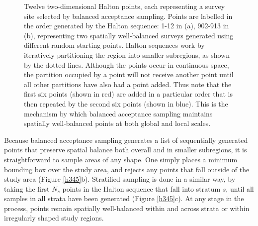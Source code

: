 \documentclass[a4paper,11pt]{article} %
\begin{document}
\begin{figure}[htbp]
\begin{subfigure}[b]{0.45\textwidth}
    \caption{}
  \end{subfigure}
\caption{Twelve two-dimensional Halton points, each representing a survey site selected by balanced acceptance sampling. Points are labelled in the order generated by the Halton sequence: 1-12 in (a), 902-913 in (b), representing two spatially well-balanced surveys generated using different random starting points. Halton sequences work by iteratively partitioning the region into smaller subregions, as shown by the dotted lines. Although the points occur in continuous space, the partition occupied by a point will not receive another point until all other partitions have also had a point added. Thus note that the first six points (shown in red) are added in a particular order that is then repeated by the second six points (shown in blue). This is the mechanism by which balanced acceptance sampling maintains spatially well-balanced points at both global and local scales.}
  \label{h12}
\end{figure}

Because balanced acceptance sampling generates a list of sequentially generated points that preserve spatial balance both overall and in smaller subregions, it is straightforward to sample areas of any shape. One simply places a minimum bounding box over the study area, and rejects any points that fall outside of the study area (Figure \ref{h345}b). Stratified sampling is done in a similar way, by taking the first $N_s$ points in the Halton sequence that fall into stratum $s$, until all samples in all strata have been generated (Figure \ref{h345}c). At any stage in the process, points remain spatially well-balanced within and across strata or within irregularly shaped study regions.
\end{document}
